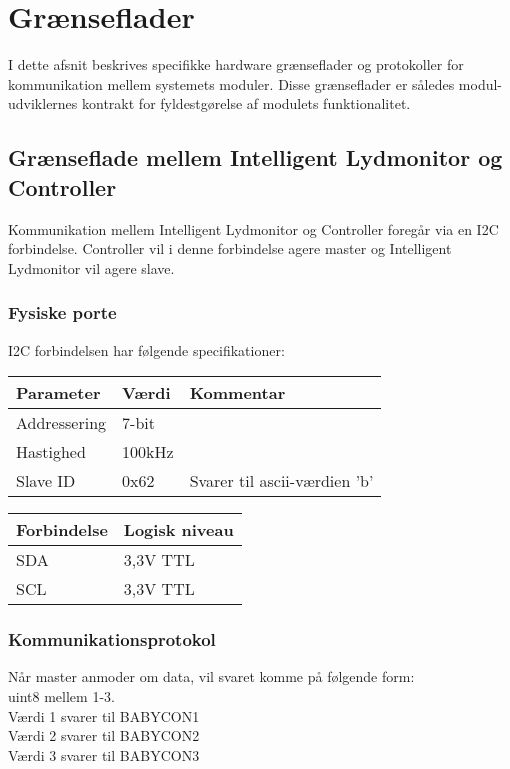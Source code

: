 
\section{Grænseflader}
I dette afsnit beskrives specifikke hardware grænseflader og protokoller for kommunikation mellem systemets moduler. Disse grænseflader er således modul-udviklernes kontrakt for fyldestgørelse af modulets funktionalitet.

\subsection{Grænseflade mellem Intelligent Lydmonitor og Controller}
Kommunikation mellem Intelligent Lydmonitor og Controller foregår via en I2C forbindelse. Controller vil i denne forbindelse agere  master og Intelligent Lydmonitor vil agere slave.

\subsubsection*{Fysiske porte}

I2C forbindelsen har følgende specifikationer:
\begin{center}
    \begin{tabular}{ | l | l | l |}
    \hline
    \textbf{Parameter} 	& \textbf{Værdi} 	& \textbf{Kommentar} 				\\ \hline
    Addressering 		& 7-bit 			&   								\\ \hline
    Hastighed 			& 100kHz 			& 									\\ \hline
    Slave ID 			& 0x62 				& Svarer til ascii-værdien 'b'		\\ \hline
    \end{tabular}
\end{center}

\begin{center}
    \begin{tabular}{ | l | l |}
    \hline
    \textbf{Forbindelse} 	& \textbf{Logisk niveau} 	\\ \hline
    SDA 					& 3,3V TTL 					\\ \hline
    SCL 					& 3,3V TTL					\\ \hline
    \end{tabular}
\end{center}


\subsubsection*{Kommunikationsprotokol}
Når master anmoder om data, vil svaret komme på følgende form: \\
uint8 mellem 1-3. \\
Værdi 1 svarer til BABYCON1 \\
Værdi 2 svarer til BABYCON2 \\
Værdi 3 svarer til BABYCON3 \\ 



